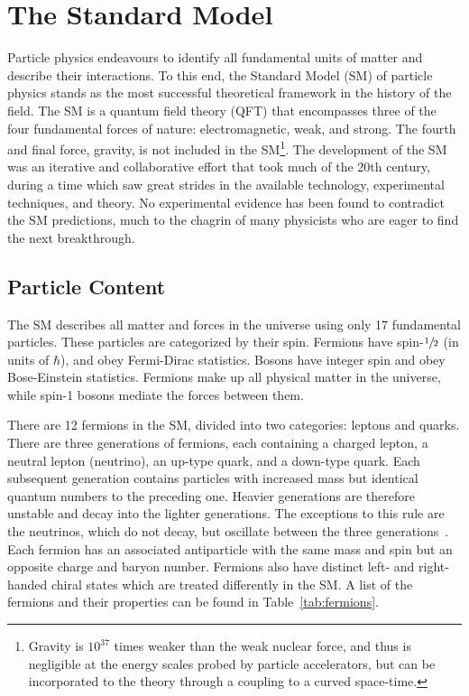 \chapter{The Standard Model}
\label{chap:sm}

Particle physics endeavours to identify all fundamental units of matter and describe their interactions.
To this end, the Standard Model (SM) of particle physics stands as the most successful theoretical framework in the history of the field.
The SM is a quantum field theory (QFT) that encompasses three of the four fundamental forces of nature: electromagnetic, weak, and strong.
The fourth and final force, gravity, is not included in the SM\footnote{Gravity is $10^{37}$ times weaker than the weak nuclear force, and thus is negligible at the energy scales probed by particle accelerators, but can be incorporated to the theory through a coupling to a curved space-time.}.
The development of the SM was an iterative and collaborative effort that took much of the 20th century, during a time which saw great strides in the available technology, experimental techniques, and theory.
No experimental evidence has been found to contradict the SM predictions, much to the chagrin of many physicists who are eager to find the next breakthrough.

\section{Particle Content}

The SM describes all matter and forces in the universe using only 17 fundamental particles.
These particles are categorized by their spin.
Fermions have spin-$\sfrac{1}{2}$ (in units of $\hbar$), and obey Fermi-Dirac statistics.
Bosons have integer spin and obey Bose-Einstein statistics.
Fermions make up all physical matter in the universe, while spin-1 bosons mediate the forces between them.

There are 12 fermions in the SM, divided into two categories: leptons and quarks.
There are three generations of fermions, each containing a charged lepton, a neutral lepton (neutrino), an up-type quark, and a down-type quark.
Each subsequent generation contains particles with increased mass but identical quantum numbers to the preceding one.
Heavier generations are therefore unstable and decay into the lighter generations.
The exceptions to this rule are the neutrinos, which do not decay, but oscillate between the three generations~\cite{NeutrinoOsc}.
Each fermion has an associated antiparticle with the same mass and spin but an opposite charge and baryon number.
Fermions also have distinct left- and right-handed chiral states which are treated differently in the SM\@.
A list of the fermions and their properties can be found in Table~\ref{tab:fermions}.

